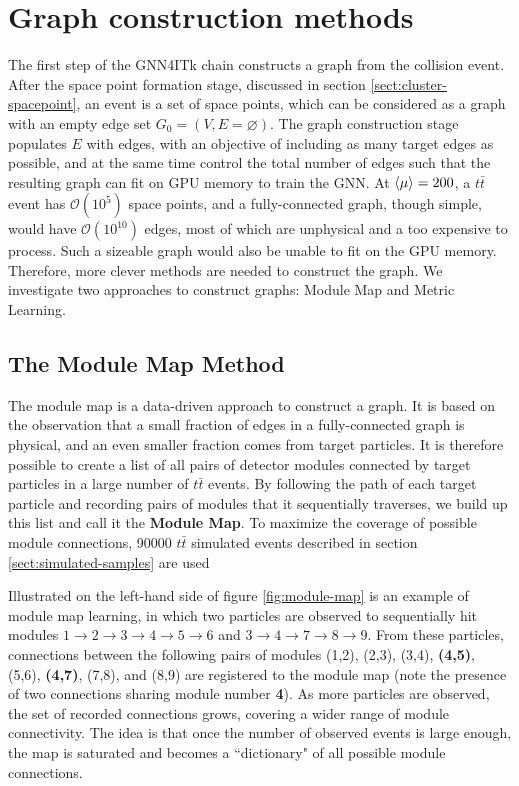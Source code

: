 \section{Graph construction methods}
\label{sect:graph-construction}
The first step of the GNN4ITk chain constructs a graph from the collision event. 
After the space point formation stage, discussed in section \ref{sect:cluster-spacepoint}, an event is a set of space points, which can be considered as a graph with an empty edge set $G_0=(V, E=\varnothing)$. 
The graph construction stage populates $E$ with edges, with an objective of including as many target edges as possible, and at the same time control the total number of edges such that the resulting graph can fit on GPU memory to train the GNN. 
At $\expval{\mu}=200$, a $t\bar{t}$ event has $\mathcal{O}(10^5)$ space points, and a fully-connected graph, though simple, would have $\mathcal{O}(10^{10})$ edges, most of which are unphysical and a too expensive to process.
Such a sizeable graph would also be unable to fit on the GPU memory. 
Therefore, more clever methods are needed to construct the graph. 
We investigate two approaches to construct graphs: Module Map and Metric Learning.

\subsection{The Module Map Method}
\label{subsect:module-map}

The module map is a data-driven approach to construct a graph. 
It is based on the observation that a small fraction of edges in a fully-connected graph is physical, and an even smaller fraction comes from target particles.
It is therefore possible to create a list of all pairs of detector modules connected by target particles in a large number of $t\bar{t}$ events. 
By following the path of each target particle and recording pairs of modules that it sequentially traverses, we build up this list and call it the \textbf{Module Map}. 
To maximize the coverage of possible module connections, 90000 $t\bar{t}$ simulated events described in section \ref{sect:simulated-samples} are used

Illustrated on the left-hand side of figure \ref{fig:module-map} is an example of module map learning, in which two particles are observed to sequentially hit modules $1\rightarrow2\rightarrow 3 \rightarrow 4 \rightarrow 5 \rightarrow 6$ and $3\rightarrow 4 \rightarrow 7 \rightarrow 8 \rightarrow 9$. 
From these particles, connections between the following pairs of modules (1,2), (2,3), (3,4), \textbf{(4,5)}, (5,6), \textbf{(4,7)}, (7,8), and (8,9) are registered to the module map (note the presence of two connections sharing module number \textbf{4}). 
As more particles are observed, the set of recorded connections grows, covering a wider range of module connectivity.
The idea is that once the number of observed events is large enough, the map is saturated and becomes a ``dictionary" of all possible module connections.

